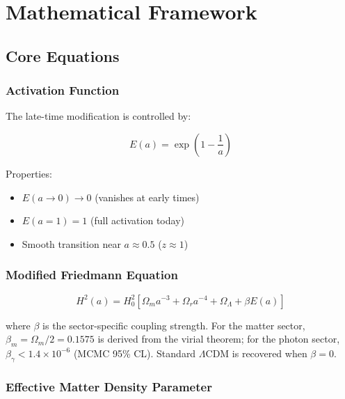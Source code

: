 \documentclass[11pt,letterpaper]{article}
\begin{document}
\section{Mathematical Framework}

\subsection{Core Equations}

\subsubsection{Activation Function}

The late-time modification is controlled by:

\begin{equation}
E(a) = \exp\left(1 - \frac{1}{a}\right)
\end{equation}

\noindent Properties:
\begin{itemize}
\item $E(a \to 0) \to 0$ (vanishes at early times)
\item $E(a = 1) = 1$ (full activation today)
\item Smooth transition near $a \approx 0.5$ ($z \approx 1$)
\end{itemize}

\subsubsection{Modified Friedmann Equation}

\begin{equation}
H^2(a) = H_0^2\left[\Omega_m a^{-3} + \Omega_r a^{-4} + \Omega_\Lambda + \beta E(a)\right]
\end{equation}

where $\beta$ is the sector-specific coupling strength. For the matter sector, $\beta_m = \Omega_m/2 = 0.1575$ is derived from the virial theorem; for the photon sector, $\beta_\gamma < 1.4 \times 10^{-6}$ (MCMC 95\% CL). Standard $\Lambda$CDM is recovered when $\beta = 0$.

\subsubsection{Effective Matter Density Parameter}
\end{document}
